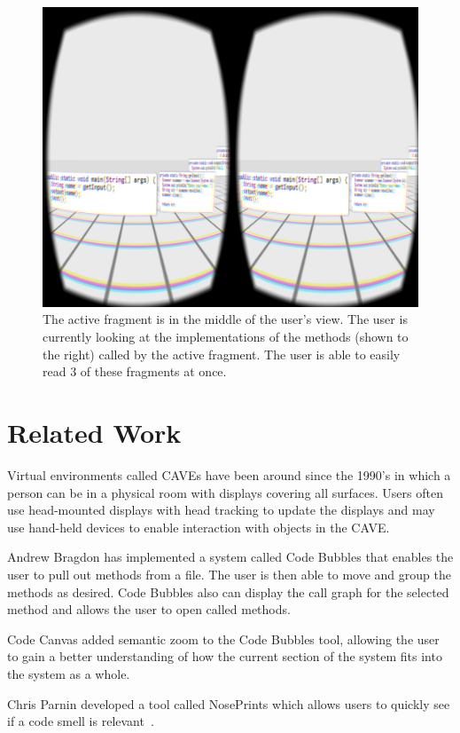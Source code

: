 \documentclass{acm_proc_article-sp}
\begin{document}
\begin{figure}[ht]
\centering
\includegraphics[width=\textwidth]{stack}
\caption{The active fragment is in the middle of the user's view. The user is currently looking at the implementations of the methods (shown to the right) called by the active fragment. The user is able to easily read 3 of these fragments at once.  \label{immersion}}
\end{figure}

\section{Related Work}
Virtual environments called CAVEs have been around since the 1990's in which a person can be in a physical room with displays covering all surfaces.  Users often use head-mounted displays with head tracking to update the displays and may use hand-held devices to enable interaction with objects in the CAVE.

Andrew Bragdon has implemented a system called Code Bubbles that enables the user to pull out methods from a file. The user is then able to move and group the methods as desired.  Code Bubbles also can display the call graph for the selected method and allows the user to open called methods.

Code Canvas added semantic zoom to the Code Bubbles tool, allowing the user to gain a better understanding of how the current section of the system fits into the system as a whole.

Chris Parnin developed a tool called NosePrints which allows users to quickly see if a code smell is relevant~\cite{parnin:Noseprints}.
\end{document}
